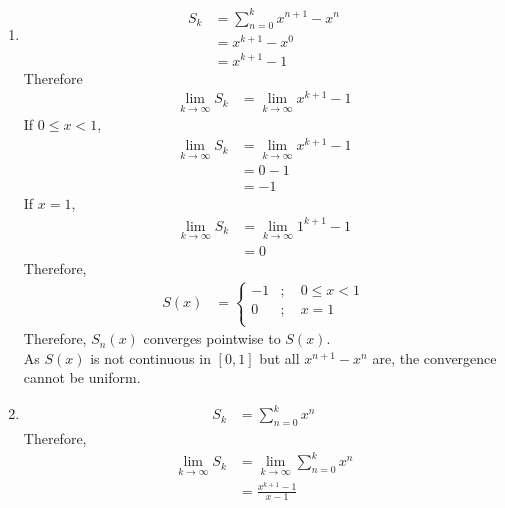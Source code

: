 \documentclass[fleqn, a4paper, 11pt, oneside]{amsart}
\theoremstyle{definition}
\theoremstyle{theorem}
\begin{document}
\begin{solution}
	\begin{enumerate}[leftmargin = *]
		\item
			\begin{align*}
				S_k & = \sum\limits_{n = 0}^{k} x^{n + 1} - x^n \\
                                    & = x^{k + 1} - x^0                         \\
                                    & = x^{k + 1} - 1
			\end{align*}
			Therefore
			\begin{align*}
				\lim\limits_{k \to \infty} S_k & = \lim\limits_{k \to \infty} x^{k + 1} - 1
			\end{align*}
			If $0 \le x < 1$,
			\begin{align*}
				\lim\limits_{k \to \infty} S_k & = \lim\limits_{k \to \infty} x^{k + 1} - 1 \\
                                                               & = 0 - 1                                    \\
                                                               & = -1
			\end{align*}
			If $x = 1$,
			\begin{align*}
				\lim\limits_{k \to \infty} S_k & = \lim\limits_{k \to \infty} 1^{k + 1} - 1 \\
                                                               & = 0
			\end{align*}
			Therefore,
			\begin{align*}
				S(x) &=
					\begin{cases}
						-1 & ;\quad 0 \le x < 1 \\
						0  & ;\quad x = 1       \\
					\end{cases}
			\end{align*}
			Therefore, $S_n(x)$ converges pointwise to $S(x)$.\\
			As $S(x)$ is not continuous in $[0,1]$ but all $x^{n + 1} - x^n$ are, the convergence cannot be uniform.
		\item
			\begin{align*}
				S_k & = \sum\limits_{n = 0}^{k} x^n
			\end{align*}
			Therefore,
			\begin{align*}
				\lim\limits_{k \to \infty} S_k & = \lim\limits_{k \to \infty} \sum\limits_{n = 0}^{k} x^n \\
                                                               & = \frac{x^{k + 1} - 1}{x - 1}

\end{align*}
\end{enumerate}
\end{solution}
\end{document}
